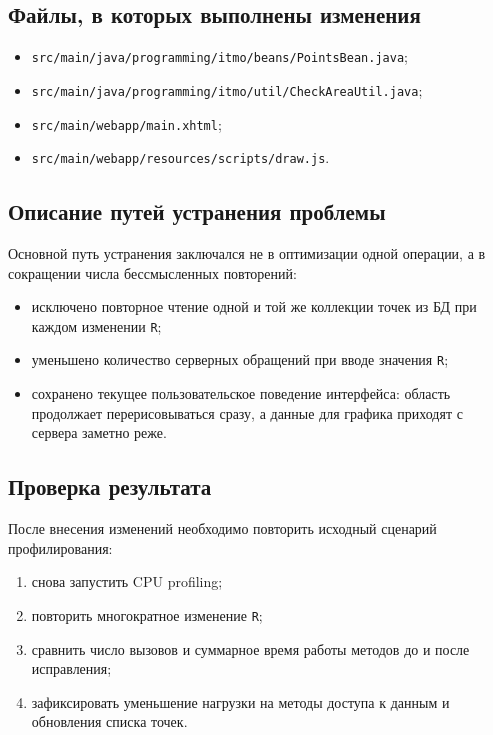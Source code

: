 \documentclass[12pt,a4paper]{article}
\begin{document}
\subsection{Файлы, в которых выполнены изменения}
\begin{itemize}[leftmargin=*]
    \item \texttt{src/main/java/programming/itmo/beans/PointsBean.java};
    \item \texttt{src/main/java/programming/itmo/util/CheckAreaUtil.java};
    \item \texttt{src/main/webapp/main.xhtml};
    \item \texttt{src/main/webapp/resources/scripts/draw.js}.
\end{itemize}

\subsection{Описание путей устранения проблемы}
Основной путь устранения заключался не в оптимизации одной операции, а в сокращении числа бессмысленных повторений:
\begin{itemize}[leftmargin=*]
    \item исключено повторное чтение одной и той же коллекции точек из БД при каждом изменении \texttt{R};
    \item уменьшено количество серверных обращений при вводе значения \texttt{R};
    \item сохранено текущее пользовательское поведение интерфейса: область продолжает перерисовываться сразу, а данные для графика приходят с сервера заметно реже.
\end{itemize}

\subsection{Проверка результата}
После внесения изменений необходимо повторить исходный сценарий профилирования:
\begin{enumerate}[leftmargin=*]
    \item снова запустить CPU profiling;
    \item повторить многократное изменение \texttt{R};
    \item сравнить число вызовов и суммарное время работы методов до и после исправления;
    \item зафиксировать уменьшение нагрузки на методы доступа к данным и обновления списка точек.
\end{enumerate}
\end{document}
